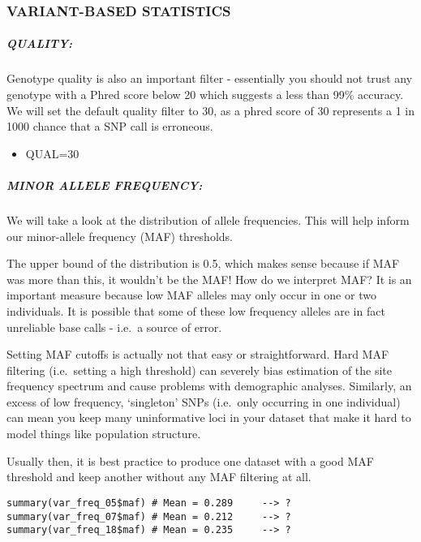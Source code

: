 \documentclass[
]{article}
\providecommand{\tightlist}{%
  \setlength{\itemsep}{0pt}\setlength{\parskip}{0pt}}
\begin{document}
\hypertarget{variant-based-statistics}{%
\subsubsection{VARIANT-BASED
STATISTICS}\label{variant-based-statistics}}

\hypertarget{quality-1}{%
\subparagraph{QUALITY:}\label{quality-1}}

Genotype quality is also an important filter - essentially you should
not trust any genotype with a Phred score below 20 which suggests a less
than 99\% accuracy. We will set the default quality filter to 30, as a
phred score of 30 represents a 1 in 1000 chance that a SNP call is
erroneous.

\begin{itemize}
\tightlist
\item
  QUAL=30
\end{itemize}

\hypertarget{minor-allele-frequency-1}{%
\subparagraph{MINOR ALLELE FREQUENCY:}\label{minor-allele-frequency-1}}

We will take a look at the distribution of allele frequencies. This will
help inform our minor-allele frequency (MAF) thresholds.

The upper bound of the distribution is 0.5, which makes sense because if
MAF was more than this, it wouldn't be the MAF! How do we interpret MAF?
It is an important measure because low MAF alleles may only occur in one
or two individuals. It is possible that some of these low frequency
alleles are in fact unreliable base calls - i.e.~a source of error.

Setting MAF cutoffs is actually not that easy or straightforward. Hard
MAF filtering (i.e.~setting a high threshold) can severely bias
estimation of the site frequency spectrum and cause problems with
demographic analyses. Similarly, an excess of low frequency, `singleton'
SNPs (i.e.~only occurring in one individual) can mean you keep many
uninformative loci in your dataset that make it hard to model things
like population structure.

Usually then, it is best practice to produce one dataset with a good MAF
threshold and keep another without any MAF filtering at all.

\begin{verbatim}
summary(var_freq_05$maf) # Mean = 0.289     --> ?
summary(var_freq_07$maf) # Mean = 0.212     --> ?
summary(var_freq_18$maf) # Mean = 0.235     --> ?
\end{verbatim}
\end{document}
